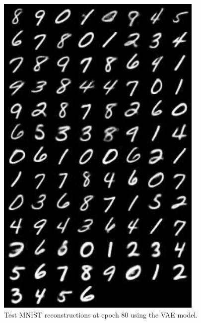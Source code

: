 \documentclass[12pt,english]{amsart}
\theoremstyle{definition}
\begin{document}
\begin{figure}[h]
\includegraphics[width=100mm]{mnist_vae_ep_79_recon}
\caption{Test MNIST reconstructions at epoch 80 using the VAE model.}
\label{Figure 5}
\end{figure}
\end{document}

